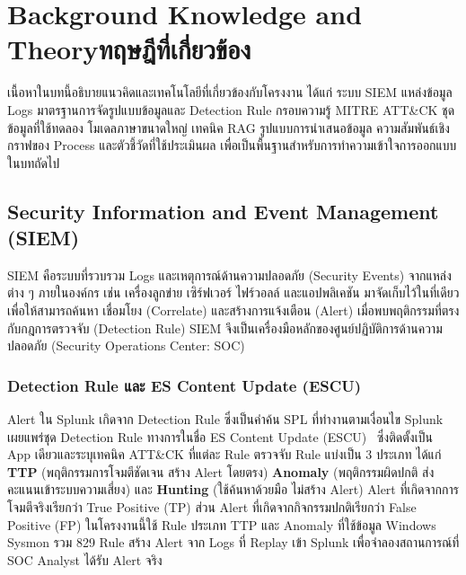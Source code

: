 \chapter{\ifenglish Background Knowledge and Theory\else ทฤษฎีที่เกี่ยวข้อง\fi}

เนื้อหาในบทนี้อธิบายแนวคิดและเทคโนโลยีที่เกี่ยวข้องกับโครงงาน
ได้แก่ ระบบ SIEM แหล่งข้อมูล Logs มาตรฐานการจัดรูปแบบข้อมูลและ Detection Rule กรอบความรู้ MITRE ATT\&CK
ชุดข้อมูลที่ใช้ทดลอง โมเดลภาษาขนาดใหญ่ เทคนิค RAG รูปแบบการนำเสนอข้อมูล
ความสัมพันธ์เชิงกราฟของ Process และตัวชี้วัดที่ใช้ประเมินผล
เพื่อเป็นพื้นฐานสำหรับการทำความเข้าใจการออกแบบในบทถัดไป

\section{Security Information and Event Management (SIEM)}

SIEM คือระบบที่รวบรวม Logs และเหตุการณ์ด้านความปลอดภัย (Security Events)
จากแหล่งต่าง ๆ ภายในองค์กร เช่น เครื่องลูกข่าย เซิร์ฟเวอร์ ไฟร์วอลล์ และแอปพลิเคชัน
มาจัดเก็บไว้ในที่เดียว เพื่อให้สามารถค้นหา เชื่อมโยง (Correlate) และสร้างการแจ้งเตือน (Alert)
เมื่อพบพฤติกรรมที่ตรงกับกฎการตรวจจับ (Detection Rule)
SIEM จึงเป็นเครื่องมือหลักของศูนย์ปฏิบัติการด้านความปลอดภัย (Security Operations Center: SOC)


\subsection{Detection Rule และ ES Content Update (ESCU)}
Alert ใน Splunk เกิดจาก Detection Rule ซึ่งเป็นคำค้น SPL ที่ทำงานตามเงื่อนไข
Splunk เผยแพร่ชุด Detection Rule ทางการในชื่อ ES Content Update (ESCU)~\cite{splunk-escu}
ซึ่งติดตั้งเป็น App เดียวและระบุเทคนิค ATT\&CK ที่แต่ละ Rule ตรวจจับ
Rule แบ่งเป็น 3 ประเภท ได้แก่ \textbf{TTP} (พฤติกรรมการโจมตีชัดเจน สร้าง Alert โดยตรง)
\textbf{Anomaly} (พฤติกรรมผิดปกติ ส่งคะแนนเข้าระบบความเสี่ยง) และ
\textbf{Hunting} (ใช้ค้นหาด้วยมือ ไม่สร้าง Alert)
Alert ที่เกิดจากการโจมตีจริงเรียกว่า True Positive (TP) ส่วน Alert ที่เกิดจากกิจกรรมปกติเรียกว่า False Positive (FP)
ในโครงงานนี้ใช้ Rule ประเภท TTP และ Anomaly ที่ใช้ข้อมูล Windows Sysmon รวม 829 Rule
สร้าง Alert จาก Logs ที่ Replay เข้า Splunk เพื่อจำลองสถานการณ์ที่ SOC Analyst ได้รับ Alert จริง

